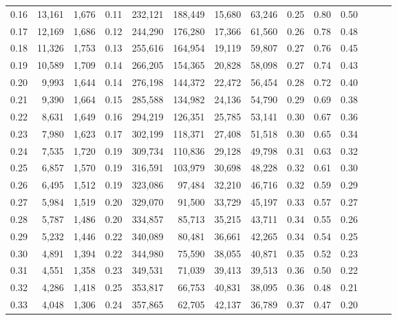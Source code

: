 \begin{tabular}{rrrrrrrrrrrrrr}
0.16 &  13,161 &  1,676 &  0.11 &  232,121 &  188,449 &  15,680 &  63,246 &  0.25 &  0.80 &      0.50 \\
0.17 &  12,169 &  1,686 &  0.12 &  244,290 &  176,280 &  17,366 &  61,560 &  0.26 &  0.78 &      0.48 \\
0.18 &  11,326 &  1,753 &  0.13 &  255,616 &  164,954 &  19,119 &  59,807 &  0.27 &  0.76 &      0.45 \\
0.19 &  10,589 &  1,709 &  0.14 &  266,205 &  154,365 &  20,828 &  58,098 &  0.27 &  0.74 &      0.43 \\
0.20 &   9,993 &  1,644 &  0.14 &  276,198 &  144,372 &  22,472 &  56,454 &  0.28 &  0.72 &      0.40 \\
0.21 &   9,390 &  1,664 &  0.15 &  285,588 &  134,982 &  24,136 &  54,790 &  0.29 &  0.69 &      0.38 \\
0.22 &   8,631 &  1,649 &  0.16 &  294,219 &  126,351 &  25,785 &  53,141 &  0.30 &  0.67 &      0.36 \\
0.23 &   7,980 &  1,623 &  0.17 &  302,199 &  118,371 &  27,408 &  51,518 &  0.30 &  0.65 &      0.34 \\
0.24 &   7,535 &  1,720 &  0.19 &  309,734 &  110,836 &  29,128 &  49,798 &  0.31 &  0.63 &      0.32 \\
0.25 &   6,857 &  1,570 &  0.19 &  316,591 &  103,979 &  30,698 &  48,228 &  0.32 &  0.61 &      0.30 \\
0.26 &   6,495 &  1,512 &  0.19 &  323,086 &   97,484 &  32,210 &  46,716 &  0.32 &  0.59 &      0.29 \\
0.27 &   5,984 &  1,519 &  0.20 &  329,070 &   91,500 &  33,729 &  45,197 &  0.33 &  0.57 &      0.27 \\
0.28 &   5,787 &  1,486 &  0.20 &  334,857 &   85,713 &  35,215 &  43,711 &  0.34 &  0.55 &      0.26 \\
0.29 &   5,232 &  1,446 &  0.22 &  340,089 &   80,481 &  36,661 &  42,265 &  0.34 &  0.54 &      0.25 \\
0.30 &   4,891 &  1,394 &  0.22 &  344,980 &   75,590 &  38,055 &  40,871 &  0.35 &  0.52 &      0.23 \\
0.31 &   4,551 &  1,358 &  0.23 &  349,531 &   71,039 &  39,413 &  39,513 &  0.36 &  0.50 &      0.22 \\
0.32 &   4,286 &  1,418 &  0.25 &  353,817 &   66,753 &  40,831 &  38,095 &  0.36 &  0.48 &      0.21 \\
0.33 &   4,048 &  1,306 &  0.24 &  357,865 &   62,705 &  42,137 &  36,789 &  0.37 &  0.47 &      0.20 \\

\end{tabular}

